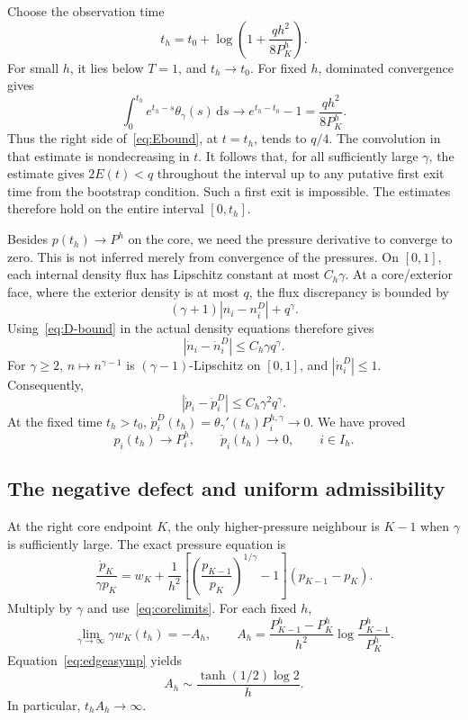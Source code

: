 \documentclass[11pt,a4paper]{article}
\theoremstyle{remark}
\newcommand{\dd}{\,\mathrm d}
\begin{document}
Choose the observation time
\begin{equation}\label{eq:th}
 t_h=t_0+\log\left(1+\frac{q h^2}{8P_K^h}\right).
\end{equation}
For small $h$, it lies below $T=1$, and $t_h\to t_0$. For fixed $h$, dominated convergence gives
\[
 \int_0^{t_h}e^{t_h-s}\theta_\gamma(s)\dd s
 \longrightarrow e^{t_h-t_0}-1=\frac{q h^2}{8P_K^h}.
\]
Thus the right side of~\eqref{eq:Ebound}, at $t=t_h$, tends to $q/4$. The convolution in that estimate is nondecreasing in $t$. It follows that, for all sufficiently large $\gamma$, the estimate gives $2E(t)<q$ throughout the interval up to any putative first exit time from the bootstrap condition. Such a first exit is impossible. The estimates therefore hold on the entire interval $[0,t_h]$.

Besides $p(t_h)\to P^h$ on the core, we need the pressure derivative to converge to zero. This is not inferred merely from convergence of the pressures. On $[0,1]$, each internal density flux has Lipschitz constant at most $C_h\gamma$. At a core/exterior face, where the exterior density is at most $q$, the flux discrepancy is bounded by
\[
 (\gamma+1)|n_i-n_i^D|+q^\gamma.
\]
Using~\eqref{eq:D-bound} in the actual density equations therefore gives
\[
 |\dot n_i-\dot n_i^D|\le C_h\gamma q^\gamma.
\]
For $\gamma\ge2$, $n\mapsto n^{\gamma-1}$ is $(\gamma-1)$-Lipschitz on $[0,1]$, and $|\dot n_i^D|\le1$. Consequently,
\begin{equation}\label{eq:derivdiff}
 |\dot p_i-\dot p_i^D|\le C_h\gamma^2q^\gamma.
\end{equation}
At the fixed time $t_h>t_0$, $\dot p_i^D(t_h)=\theta_\gamma'(t_h)P_i^{h,\gamma}\to0$. We have proved
\begin{equation}\label{eq:corelimits}
 p_i(t_h)\longrightarrow P_i^h,\qquad
 \dot p_i(t_h)\longrightarrow0,\qquad i\in I_h.
\end{equation}

\subsection{The negative defect and uniform admissibility}

At the right core endpoint $K$, the only higher-pressure neighbour is $K-1$ when $\gamma$ is sufficiently large. The exact pressure equation is
\begin{equation}\label{eq:pressureidentity}
 \frac{\dot p_K}{\gamma p_K}
 =w_K+\frac1{h^2}
 \left[\left(\frac{p_{K-1}}{p_K}\right)^{1/\gamma}-1\right]
 (p_{K-1}-p_K).
\end{equation}
Multiply by $\gamma$ and use~\eqref{eq:corelimits}. For each fixed $h$,
\begin{equation}\label{eq:scaledlimit}
 \lim_{\gamma\to\infty}\gamma w_K(t_h)=-A_h,\qquad
 A_h=\frac{P_{K-1}^h-P_K^h}{h^2}
 \log\frac{P_{K-1}^h}{P_K^h}.
\end{equation}
Equation~\eqref{eq:edgeasymp} yields
\begin{equation}\label{eq:Aasymp}
 A_h\sim\frac{\tanh(1/2)\log2}{h}.
\end{equation}
In particular, $t_hA_h\to\infty$.
\end{document}
